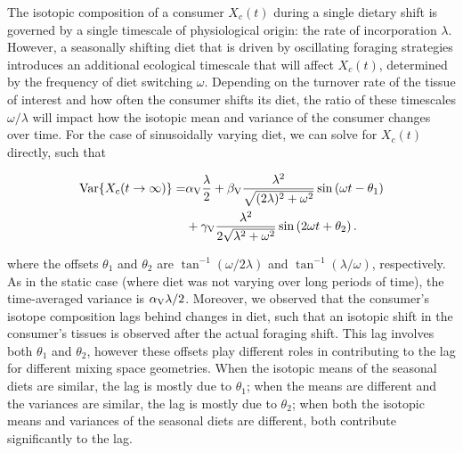 \documentclass{frontiersSCNS}
\begin{document}
The isotopic composition of a consumer $X_c(t)$ during a single dietary shift is governed by a single timescale of physiological origin: the rate of incorporation $\lambda$.
However, a seasonally shifting diet that is driven by oscillating foraging strategies introduces an additional ecological timescale that will affect $X_c(t)$, determined by the frequency of diet switching $\omega$.
Depending on the turnover rate of the tissue of interest and how often the consumer shifts its diet, the ratio of these timescales $\omega/\lambda$ will impact how the isotopic mean and variance of the consumer changes over time.
For the case of sinusoidally varying diet, we can solve for $X_c(t)$ directly, such that

\begin{align}
  \label{eqXsin}
  \begin{split}
    {\rm Var}\{X_c(t \to \infty)\} = &\alpha_{\rm V}\frac{\lambda}{2} + \beta_{\rm V}\frac{\lambda^2}{\sqrt{(2\lambda)^2 + \omega^2}}\sin\left(\omega t -\theta_1\right) \\
    &+ \gamma_{\rm V}\frac{\lambda^2}{2\sqrt{\lambda^2 + \omega^2}}\sin\left(2\omega t + \theta_2\right).
  \end{split}
\end{align}

\noindent where the offsets $\theta_1$ and $\theta_2$ are $ \tan^{-1}(\omega/2\lambda)$ and $ \tan^{-1}(\lambda/\omega)$, respectively.
As in the static case (where diet was not varying over long periods of time), the time-averaged variance is $\alpha_{\rm V}\lambda/2$.
Moreover, we observed that the consumer's isotope composition lags behind changes in diet, such that an isotopic shift in the consumer's tissues is observed after the actual foraging shift.
This lag involves both $\theta_1$ and $\theta_2$, however these offsets play different roles in contributing to the lag for different mixing space geometries.
When the isotopic means of the seasonal diets are similar, the lag is mostly due to $\theta_1$; when the means are different and the variances are similar, the lag is mostly due to $\theta_2$; when both the isotopic means and variances of the seasonal diets are different, both contribute significantly to the lag.
\end{document}
